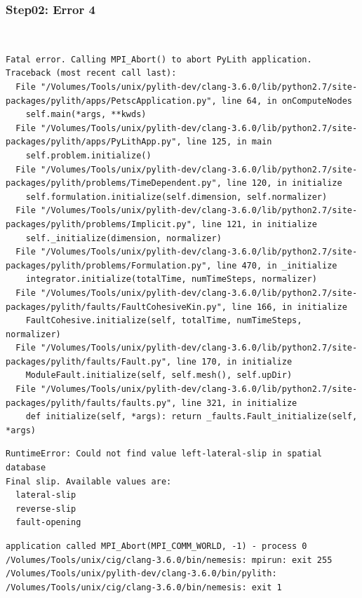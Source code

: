 \documentclass{beamer}
\begin{document}
\begin{frame}[fragile]
  \frametitle{Step02: Error 4}

\\
\begin{lstlisting}
Fatal error. Calling MPI_Abort() to abort PyLith application.
Traceback (most recent call last):
  File "/Volumes/Tools/unix/pylith-dev/clang-3.6.0/lib/python2.7/site-packages/pylith/apps/PetscApplication.py", line 64, in onComputeNodes
    self.main(*args, **kwds)
  File "/Volumes/Tools/unix/pylith-dev/clang-3.6.0/lib/python2.7/site-packages/pylith/apps/PyLithApp.py", line 125, in main
    self.problem.initialize()
  File "/Volumes/Tools/unix/pylith-dev/clang-3.6.0/lib/python2.7/site-packages/pylith/problems/TimeDependent.py", line 120, in initialize
    self.formulation.initialize(self.dimension, self.normalizer)
  File "/Volumes/Tools/unix/pylith-dev/clang-3.6.0/lib/python2.7/site-packages/pylith/problems/Implicit.py", line 121, in initialize
    self._initialize(dimension, normalizer)
  File "/Volumes/Tools/unix/pylith-dev/clang-3.6.0/lib/python2.7/site-packages/pylith/problems/Formulation.py", line 470, in _initialize
    integrator.initialize(totalTime, numTimeSteps, normalizer)
  File "/Volumes/Tools/unix/pylith-dev/clang-3.6.0/lib/python2.7/site-packages/pylith/faults/FaultCohesiveKin.py", line 166, in initialize
    FaultCohesive.initialize(self, totalTime, numTimeSteps, normalizer)
  File "/Volumes/Tools/unix/pylith-dev/clang-3.6.0/lib/python2.7/site-packages/pylith/faults/Fault.py", line 170, in initialize
    ModuleFault.initialize(self, self.mesh(), self.upDir)
  File "/Volumes/Tools/unix/pylith-dev/clang-3.6.0/lib/python2.7/site-packages/pylith/faults/faults.py", line 321, in initialize
    def initialize(self, *args): return _faults.Fault_initialize(self, *args)
\end{lstlisting}
\begin{lstlisting}
RuntimeError: Could not find value left-lateral-slip in spatial database
Final slip. Available values are:
  lateral-slip
  reverse-slip
  fault-opening
\end{lstlisting}
\begin{lstlisting}
application called MPI_Abort(MPI_COMM_WORLD, -1) - process 0
/Volumes/Tools/unix/cig/clang-3.6.0/bin/nemesis: mpirun: exit 255
/Volumes/Tools/unix/pylith-dev/clang-3.6.0/bin/pylith: /Volumes/Tools/unix/cig/clang-3.6.0/bin/nemesis: exit 1
\end{lstlisting}

\end{frame}
\end{document}
